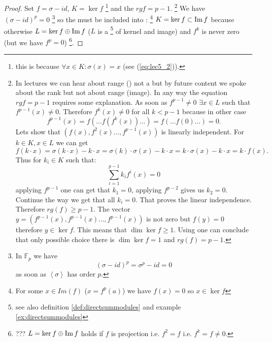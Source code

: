 \begin{theorem}
\begin{proof}
    Set $f = \sigma -id$, $K = \ker f$
    \footnote{
      this is because
      $\forall x \in K: \sigma\left(x\right) = x$ (see
      (\ref{eq:lec5_2})).
    }
    and the  $rg f = p -1$.
    \footnote{
      In lectures we can hear about range () not a
       but by future content we spoke about the rank
      but not about range (image). In any way the equation $rg f = p
      -1$ requires some explanation. As soon as $f^{p-1} \ne 0$
      $\exists x \in L$ such that $f^{p-1}\left(x\right) \ne
      0$. Therefore $f^{k}\left(x\right) \ne 0$  for all $k < p - 1$
      because in other case
      \[
      f^{p-1}\left(x\right) = f\left( \dots f\left(
      f^k\left(x\right) \right) \dots \right) =
      f\left( \dots f\left( 0 \right) \dots \right) =
      0.
      \]
      Lets show that $\left(f\left(x\right), f^2\left(x\right)\dots,
      f^{p-1}\left(x\right) \right)$ is linearly independent.
      For $k \in K, x \in L$ we can get
      \[
      f\left(k \cdot x\right) =
      \sigma\left(k \cdot x\right) - k \cdot x =
      \sigma\left(k\right) \cdot \sigma\left(x\right) -
      k \cdot x = k \cdot \sigma\left(x\right) - k \cdot x =
      k \cdot f\left(x\right).
      \]
      Thus for $k_i \in K$ such that:
      \[
      \sum_{i=1}^{p-1} k_i f^i\left(x\right) = 0
      \]
      applying $f^{p-1}$ one can get that $k_1 = 0$, applying
      $f^{p-2}$ gives us $k_2 = 0$. Continue the way we get that all
      $k_i = 0$. That proves the linear independence. Therefore
      $rg\left(f\right) \ge p - 1$. The vector
      $y = \left(f^{p-1}\left(x\right), f^{p-1}\left(x\right)\dots,
      f^{p-1}\left(x\right) \right)$ is not zero but $f(y) = 0$
      therefore $y \in \ker f$. This means that $\dim{\ker f} \ge
      1$. Using  one can conclude that only
      possible choice there is $\dim{\ker f} = 1$ and
      $rg\left(f\right) = p - 1$. 
    }
    We have 
    $\left(\sigma - id\right)^p = 0$
    \footnote{
      In $\mathbb{F}_p$ we have
      \[
      \left(\sigma - id\right)^p = \sigma^p - id = 0
      \]
      as soon as $\left<\sigma\right>$ has order $p$.      
    }
    so the  must
    be included into :
    \footnote{
      For some $x \in Im\left(f\right)$
      ($x = f^p(a)$)
      we have
      $f(x) = 0$ so $x \in \ker{f}$
    }
    $K = \ker f \subset \operatorname{Im} f$
    because otherwise $L = \ker f \oplus \operatorname{Im} f$ ($L$ is a
    \footnote{
      see also definition \ref{def:directsummodules} and example
      \ref{ex:directsummodules} 
    }
    of 
    kernel and image) and $f^k$ is never zero (but we have $f^p = 0$)
    \footnote{
      ??? $L = \ker f \oplus \operatorname{Im} f$ holds if $f$ is projection i.e.
      $f^2 = f$ i.e. $f^k = f \ne 0$.
    }.


\end{proof}
\end{theorem}
